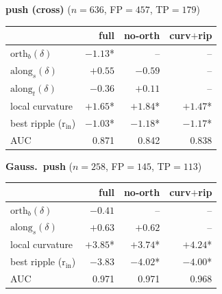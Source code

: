 \begin{table}[t]
\medskip
\textbf{push (cross)} ($n=636$, FP$=457$, TP$=179$)

\begin{tabular}{l r r r}
\toprule
 & full & no-orth & curv$+$rip \\
\midrule
$\mathrm{orth}_b(\delta)$ & $-1.13$* & -- & -- \\
$\mathrm{along}_s(\delta)$ & $+0.55$ & $-0.59$ & -- \\
$\mathrm{along}_t(\delta)$ & $-0.36$ & $+0.11$ & -- \\
local curvature & $+1.65$* & $+1.84$* & $+1.47$* \\
best ripple (r$_\mathrm{in}$) & $-1.03$* & $-1.18$* & $-1.17$* \\
AUC & 0.871 & 0.842 & 0.838 \\
\bottomrule
\end{tabular}

\medskip
\textbf{Gauss.\ push} ($n=258$, FP$=145$, TP$=113$)

\begin{tabular}{l r r r}
\toprule
 & full & no-orth & curv$+$rip \\
\midrule
$\mathrm{orth}_b(\delta)$ & $-0.41$ & -- & -- \\
$\mathrm{along}_s(\delta)$ & $+0.63$ & $+0.62$ & -- \\
local curvature & $+3.85$* & $+3.74$* & $+4.24$* \\
best ripple (r$_\mathrm{in}$) & $-3.83$ & $-4.02$* & $-4.00$* \\
AUC & 0.971 & 0.971 & 0.968 \\
\bottomrule
\end{tabular}

\end{table}
